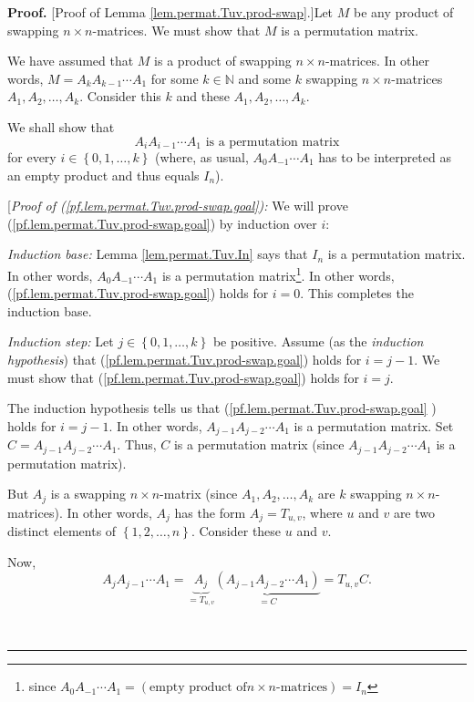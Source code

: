 \documentclass[numbers=enddot,12pt,final,onecolumn,notitlepage]{scrartcl}%
\theoremstyle{definition}
\newenvironment{proof}[1][Proof]{\noindent\textbf{#1.} }{\ \rule{0.5em}{0.5em}}
\begin{document}
\begin{proof}
[Proof of Lemma \ref{lem.permat.Tuv.prod-swap}.]Let $M$ be any product of
swapping $n\times n$-matrices. We must show that $M$ is a permutation matrix.

We have assumed that $M$ is a product of swapping $n\times n$-matrices. In
other words, $M=A_{k}A_{k-1}\cdots A_{1}$ for some $k\in\mathbb{N}$ and some
$k$ swapping $n\times n$-matrices $A_{1},A_{2},\ldots,A_{k}$. Consider this
$k$ and these $A_{1},A_{2},\ldots,A_{k}$.

We shall show that%
\begin{equation}
A_{i}A_{i-1}\cdots A_{1}\text{ is a permutation matrix}
\label{pf.lem.permat.Tuv.prod-swap.goal}%
\end{equation}
for every $i\in\left\{  0,1,\ldots,k\right\}  $ (where, as usual, $A_{0}%
A_{-1}\cdots A_{1}$ has to be interpreted as an empty product and thus equals
$I_{n}$).

[\textit{Proof of (\ref{pf.lem.permat.Tuv.prod-swap.goal}):} We will prove
(\ref{pf.lem.permat.Tuv.prod-swap.goal}) by induction over $i$:

\textit{Induction base:} Lemma \ref{lem.permat.Tuv.In} says that $I_{n}$ is a
permutation matrix. In other words, $A_{0}A_{-1}\cdots A_{1}$ is a permutation
matrix\footnote{since $A_{0}A_{-1}\cdots A_{1}=\left(  \text{empty product of
}n\times n\text{-matrices}\right)  =I_{n}$}. In other words,
(\ref{pf.lem.permat.Tuv.prod-swap.goal}) holds for $i=0$. This completes the
induction base.

\textit{Induction step:} Let $j\in\left\{  0,1,\ldots,k\right\}  $ be
positive. Assume (as the \textit{induction hypothesis}) that
(\ref{pf.lem.permat.Tuv.prod-swap.goal}) holds for $i=j-1$. We must show that
(\ref{pf.lem.permat.Tuv.prod-swap.goal}) holds for $i=j$.

The induction hypothesis tells us that (\ref{pf.lem.permat.Tuv.prod-swap.goal}%
) holds for $i=j-1$. In other words, $A_{j-1}A_{j-2}\cdots A_{1}$ is a
permutation matrix. Set $C=A_{j-1}A_{j-2}\cdots A_{1}$. Thus, $C$ is a
permutation matrix (since $A_{j-1}A_{j-2}\cdots A_{1}$ is a permutation matrix).

But $A_{j}$ is a swapping $n\times n$-matrix (since $A_{1},A_{2},\ldots,A_{k}$
are $k$ swapping $n\times n$-matrices). In other words, $A_{j}$ has the form
$A_{j}=T_{u,v}$, where $u$ and $v$ are two distinct elements of $\left\{
1,2,\ldots,n\right\}  $. Consider these $u$ and $v$.

Now,%
\begin{equation}
A_{j}A_{j-1}\cdots A_{1}=\underbrace{A_{j}}_{=T_{u,v}}\underbrace{\left(
A_{j-1}A_{j-2}\cdots A_{1}\right)  }_{=C}=T_{u,v}C.
\label{pf.lem.permat.Tuv.prod-swap.goal.pf.1}%
\end{equation}



\end{proof}
\end{document}
